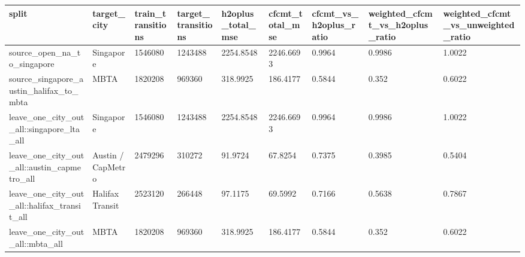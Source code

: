 \begin{tabular}{lllllllll}
\toprule
split & target\_city & train\_transitions & target\_transitions & h2oplus\_total\_mse & cfcmt\_total\_mse & cfcmt\_vs\_h2oplus\_ratio & weighted\_cfcmt\_vs\_h2oplus\_ratio & weighted\_cfcmt\_vs\_unweighted\_ratio \\
\midrule
source\_open\_na\_to\_singapore & Singapore & 1546080 & 1243488 & 2254.8548 & 2246.6693 & 0.9964 & 0.9986 & 1.0022 \\
source\_singapore\_austin\_halifax\_to\_mbta & MBTA & 1820208 & 969360 & 318.9925 & 186.4177 & 0.5844 & 0.352 & 0.6022 \\
leave\_one\_city\_out\_all::singapore\_lta\_all & Singapore & 1546080 & 1243488 & 2254.8548 & 2246.6693 & 0.9964 & 0.9986 & 1.0022 \\
leave\_one\_city\_out\_all::austin\_capmetro\_all & Austin / CapMetro & 2479296 & 310272 & 91.9724 & 67.8254 & 0.7375 & 0.3985 & 0.5404 \\
leave\_one\_city\_out\_all::halifax\_transit\_all & Halifax Transit & 2523120 & 266448 & 97.1175 & 69.5992 & 0.7166 & 0.5638 & 0.7867 \\
leave\_one\_city\_out\_all::mbta\_all & MBTA & 1820208 & 969360 & 318.9925 & 186.4177 & 0.5844 & 0.352 & 0.6022 \\
\bottomrule
\end{tabular}
